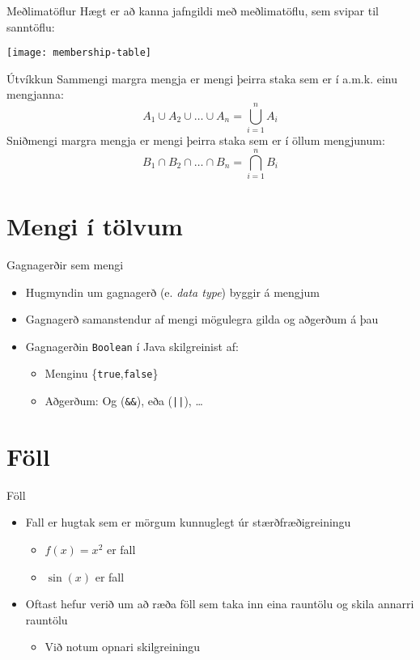 \documentclass{beamer}
\begin{document}
\begin{frame}{Meðlimatöflur}
Hægt er að kanna jafngildi með meðlimatöflu, sem svipar til sanntöflu:
\begin{center}
\texttt{[image: membership-table]}
\end{center}
\end{frame}

\begin{frame}{Útvíkkun}
Sammengi margra mengja er mengi þeirra staka sem er í a.m.k. einu mengjanna:
\[
 A_1 \cup A_2 \cup \ldots \cup A_n = \bigcup_{i=1}^n A_i
\]
Sniðmengi margra mengja er mengi þeirra staka sem er í öllum mengjunum:
\[
 B_1 \cap B_2 \cap \ldots \cap B_n = \bigcap_{i=1}^n B_i
\]
\end{frame}

\section{Mengi í tölvum}

\begin{frame}[fragile]{Gagnagerðir sem mengi}
 \begin{itemize}
  \item Hugmyndin um gagnagerð (e. \emph{data type}) byggir á mengjum
  \item Gagnagerð samanstendur af mengi mögulegra gilda og aðgerðum á þau
  \item Gagnagerðin \texttt{Boolean} í Java skilgreinist af:
  \begin{itemize}
   \item Menginu \{\texttt{true},\texttt{false}\}
   \item Aðgerðum: Og (\verb|&&|), eða (\verb&||&), \ldots
  \end{itemize}
 \end{itemize}
\end{frame}

\section{Föll}

\begin{frame}{Föll}
\begin{itemize}
 \item Fall er hugtak sem er mörgum kunnuglegt úr stærðfræðigreiningu
 \begin{itemize}
  \item $f(x) = x^2$ er fall
  \item $\sin(x)$ er fall
 \end{itemize}
 \item Oftast hefur verið um að ræða föll sem taka inn eina rauntölu og skila annarri rauntölu
 \begin{itemize}
  \item Við notum opnari skilgreiningu
 \end{itemize}
\end{itemize}
\end{frame}
\end{document}
